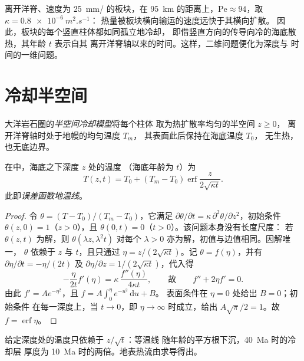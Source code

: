 离开洋脊、速度为 \qty{25}{mm/} 的板块，在
\qty{95}{km} 的距离上，$\mathrm{Pe} \approx 94$，取 $\kappa = \qty{0.8e-6}{m^2.s^{-1}}$：
热量被板块横向输运的速度远快于其横向扩散。
因此，板块的每个竖直柱体都如同孤立地冷却，
即借竖直方向的传导向冷的海底散热，其年龄 $t$ 表示自其
离开洋脊轴以来的时间。这样，二维问题便化为深度与
时间的一维问题。

\section{冷却半空间}

\begin{definition}[半空间冷却模型]\label{def:b3:lithosphere-thermal-models:half-space}
大洋岩石圈的\emph{半空间冷却模型}将每个柱体
取为热扩散率均匀的半空间 $z \ge 0$，
离开洋脊轴时处于地幔的均匀温度 $T_m$，
其表面此后保持在海底温度 $T_0$，
无生热，也无底边界。
\end{definition}

\begin{theorem}[误差函数地温线]\label{thm:b3:lithosphere-thermal-models:erf}
在中，海底之下深度 $z$ 处的温度
（海底年龄为 $t$）为
\[
  T(z, t) = T_0 + (T_m - T_0)\operatorname{erf}\frac{z}{2\sqrt{\kappa t}} .
\]
此即\emph{误差函数地温线}。
\end{theorem}

\begin{proof}
令 $\theta = (T - T_0)/(T_m - T_0)$，它满足 $\partial\theta/\partial t =
\kappa\,\partial^2\theta/\partial z^2$，初始条件 $\theta(z, 0) = 1$（$z > 0$），且
$\theta(0, t) = 0$（$t > 0$）。该问题本身没有长度尺度：
若 $\theta(z, t)$ 为解，则
$\theta(\lambda z, \lambda^2t)$ 对每个 $\lambda > 0$ 亦为解，初值与边值相同。因解唯一，
$\theta$ 依赖于 $z$ 与 $t$，且只通过 $\eta = z/(2\sqrt{\kappa
t})$。记 $\theta = f(\eta)$，并有 $\partial\eta/\partial t = -\eta/(2t)$ 及
$\partial\eta/\partial z = 1/(2\sqrt{\kappa t})$，代入得
\[
  -\frac{\eta}{2t}f'(\eta) = \kappa\,\frac{f''(\eta)}{4\kappa t},
  \qquad\text{故}\qquad f'' + 2\eta f' = 0 .
\]
由此 $f' = Ae^{-\eta^2}$，且 $f = A\int_0^\eta e^{-u^2}\,\mathrm du + B$。
表面条件在 $\eta = 0$ 处给出 $B = 0$；初始条件
在每一深度上，当 $t \to 0$，即 $\eta \to \infty$ 时成立，给出
$A\sqrt\pi/2 = 1$。故 $f = \operatorname{erf}\eta$。
\end{proof}

给定深度处的温度只依赖于 $z/\sqrt t$：等温线
随年龄的平方根下沉，\qty{40}{Ma} 时的冷却层
厚度为 \qty{10}{Ma} 时的两倍。地表热流由求导得出。

